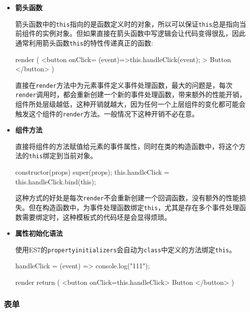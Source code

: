 \begin{itemize}
  \item \textbf{箭头函数}
  
  箭头函数中的\texttt{this}指向的是函数定义时的对象，所以可以保证\texttt{this}总是指向当前组件的实例对象。但如果直接在箭头函数中写逻辑会让代码变得很乱，因此通常利用箭头函数\texttt{this}的特性传递真正的函数:

\begin{JavaScript}
render (
  <button onClick={ (event)=>{this.handleClick(event);} }> Button </button>
)
\end{JavaScript}

直接在\texttt{render}方法中为元素事件定义事件处理函数，最大的问题是，每次\texttt{render}调用时，都会重新创建一个新的事件处理函数，带来额外的性能开销，组件所处层级越低，这种开销就越大，因为任何一个上层组件的变化都可能会触发这个组件的\texttt{render}方法。一般情况下这种开销不必在意。

  \item \textbf{组件方法}
  
  直接将组件的方法赋值给元素的事件属性，同时在类的构造函数中，将这个方法的\texttt{this}绑定到当前对象。

\begin{JavaScript}
constructor(props) {
  super(props);
  this.handleClick = this.handleClick.bind(this);
}
\end{JavaScript}

这种方式的好处是每次\texttt{render}不会重新创建一个回调函数，没有额外的性能损失。但在构造函数中，为事件处理函数绑定\texttt{this}，尤其是存在多个事件处理函数需要绑定时，这种模板式的代码坯是会显得烦琐。

  \item \textbf{属性初始化语法}
  
使用ES7的\texttt{propertyinitializers}会自动为\texttt{class}中定义的方法绑定\texttt{this}。

\begin{JavaScript}
handleClick = (event) => {
  console.log("111");
}

render {
  return (
    <button onClick={this.handleClick}> Button </button>
  )
}
\end{JavaScript}

\end{itemize}

\subsubsection{表单}

